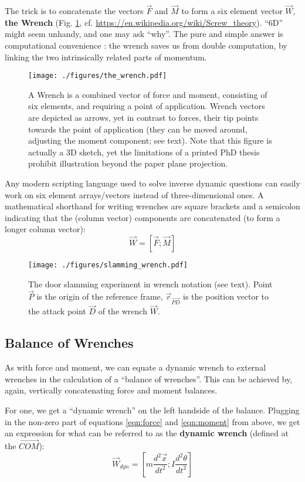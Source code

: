The trick is to concatenate the vectors \(\vec{F}\) and \(\vec{M}\) to form a six element vector \(\vec{W}\), \textbf{the Wrench} (Fig. \ref{fig:wrench}, cf. \url{https://en.wikipedia.org/wiki/Screw\_theory}).
``6D'' might seem unhandy, and one may ask ``why''.
The pure and simple answer is computational convenience \citep{Dumas2004,Mueller2018}: the wrench saves us from double computation, by linking the two intrinsically related parts of momentum.

\begin{figure}[p]
\centering
\texttt{[image: ./figures/the\_wrench.pdf]}
\caption{\label{fig:wrench}A Wrench is a combined vector of force and moment, consisting of six elements, and requiring a point of application. Wrench vectors are depicted as arrows, yet in contrast to forces, their tip points towards the point of application (they can be moved around, adjusting the moment component; see text). Note that this figure is actually a 3D sketch, yet the limitations of a printed PhD thesis prohibit illustration beyond the paper plane projection.}
\end{figure}


Any modern scripting language used to solve inverse dynamic questions can easily work on six element arrays/vectors instead of three-dimensional ones.
A mathematical shorthand for writing wrenches are square brackets and a semicolon indicating that the (column vector) components are concatenated (to form a longer column vector):
\[\vec{W} = \left[ \vec{F}; \vec{M} \right]\]

\begin{figure}[p]
\centering
\texttt{[image: ./figures/slamming\_wrench.pdf]}
\caption{\label{fig:slamming_wrench}The door slamming experiment in wrench notation (see text). Point \(\vec{P}\) is the origin of the reference frame, \(\vec{r}_{\vec{PD}}\) is the position vector to the attack point \(\vec{D}\) of the wrench \(\vec{W}\).}
\end{figure}


\FloatBarrier
\subsection{Balance of Wrenches}
\label{sec:org9bcc144}
As with force and moment, we can equate a dynamic wrench to external wrenches in the calculation of a ``balance of wrenches''.
This can be achieved by, again, vertically concatenating force and moment balances.


For one, we get a ``dynamic wrench'' on the left handside of the balance.
Plugging in the non-zero part of equations \eqref{eqn:force} and \eqref{eqn:moment} from above, we get an expression for what can be referred to as the \textbf{dynamic wrench} (defined at the \(\vec{COM}\)):
\begin{equation}\label{eqn:dynamic_wrench}
\vec{W}_{dyn} = \left[ m\frac{d^2\vec{x}}{dt^2}; I\frac{d^2\theta}{dt^2} \right]
\end{equation}

